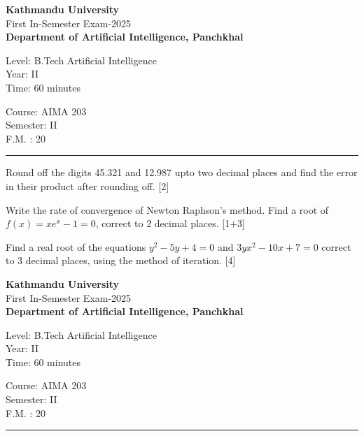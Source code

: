 \documentclass[12pt]{exam}
\begin{document}
\begin{center}
 {\bfseries  { Kathmandu University}} \\[-1mm]
 First In-Semester Exam-2025\\[-2mm]
 {\small \textbf{Department of Artificial Intelligence, Panchkhal}}
\end{center}
\begin{minipage}{0.70\linewidth}
  \small
  \begin{flushleft}
    Level: B.Tech Artificial Intelligence \\
    Year: II \\
    Time: 60 minutes
  \end{flushleft}
\end{minipage} \hfill
\begin{minipage}{0.25\linewidth}
  \begin{flushleft}
    Course: AIMA 203 \\
    Semester: II \\
    F.M. : 20
  \end{flushleft}
\end{minipage}
\vskip 1mm
\rule{\textwidth}{1pt}
\vskip -5mm
\begin{questions}

\question Round off the digits 45.321 and 12.987 upto two decimal places and find the error in their product after rounding off. [2]

\question Write the rate of convergence of Newton Raphson's method. Find a root of \(f(x)=xe^x-1=0\), correct to \(2\) decimal places. [1+3]

\question Find a real root of the equations $y^2-5y+4=0$ and $3yx^2-10x+7=0$ correct to 3 decimal places, using the method of iteration. [4]

\end{questions}

\vspace{4cm}
\begin{center}
 {\bfseries  {Kathmandu University}} \\[-1mm]
 First In-Semester Exam-2025\\[-2mm]
 {\small \textbf{Department of Artificial Intelligence, Panchkhal}}
\end{center}
\begin{minipage}{0.70\linewidth}
  \small
  \begin{flushleft}
    Level: B.Tech Artificial Intelligence \\
    Year: II \\
    Time: 60 minutes
  \end{flushleft}
\end{minipage} \hfill
\begin{minipage}{0.25\linewidth}
  \begin{flushleft}
    Course: AIMA 203 \\
    Semester: II \\
    F.M. : 20
  \end{flushleft}
\end{minipage}
\vskip 1mm
\rule{\textwidth}{1pt}
\end{document}
